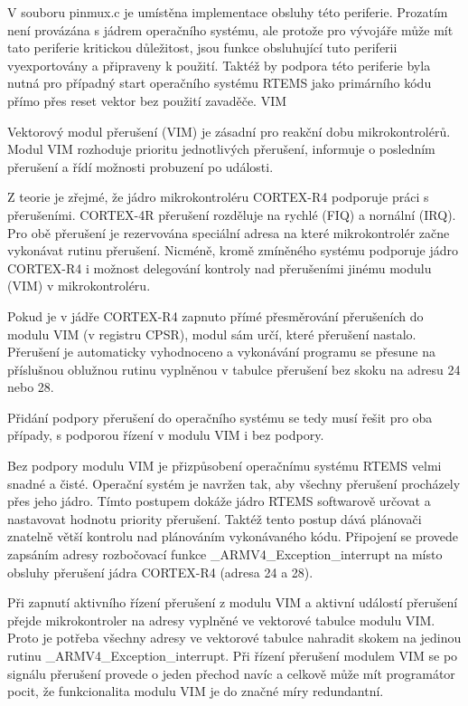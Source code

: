 V souboru pinmux.c je umístěna implementace obsluhy této periferie.
Prozatím není provázána s jádrem operačního systému, ale protože pro vývojáře může mít tato periferie kritickou důležitost, jsou funkce obsluhující tuto periferii vyexportovány a připraveny k použití.
Taktéž by podpora této periferie byla nutná pro případný start operačního systému RTEMS jako primárního kódu přímo přes reset vektor bez použití zavaděče.
\secc	VIM

Vektorový modul přerušení (VIM) je zásadní pro reakční dobu mikrokontrolérů.
Modul VIM rozhoduje prioritu jednotlivých přerušení, informuje o posledním přerušení a řídí možnosti probuzení po události.

Z teorie je zřejmé, že jádro mikrokontroléru CORTEX-R4 podporuje práci s přerušeními.
CORTEX-4R přerušení rozděluje na rychlé (FIQ) a nornální (IRQ).
Pro obě přerušení je rezervována speciální adresa na které mikrokontrolér začne vykonávat rutinu přerušení.
Nicméně, kromě zmíněného systému podporuje jádro CORTEX-R4 i možnost delegování kontroly nad přerušeními jinému modulu (VIM) v mikrokontroléru.

Pokud je v jádře CORTEX-R4 zapnuto přímé přesměrování přerušeních do modulu VIM (v registru CPSR), modul sám určí, které přerušení nastalo.
Přerušení je automaticky vyhodnoceno a vykonávání programu se přesune na příslušnou oblužnou rutinu vyplněnou v tabulce přerušení bez skoku na adresu 24 nebo 28.

Přidání podpory přerušení do operačního systému se tedy musí řešit pro oba případy, s podporou řízení v modulu VIM i bez podpory.

Bez podpory modulu VIM je přizpůsobení operačnímu systému RTEMS velmi snadné a čisté.
Operační systém je navržen tak, aby všechny přerušení procházely přes jeho jádro.
Tímto postupem dokáže jádro RTEMS softwarově určovat a nastavovat hodnotu priority přerušení.
Taktéž tento postup dává plánovači znatelně větší kontrolu nad plánováním vykonávaného kódu.
Připojení se provede zapsáním adresy rozbočovací funkce \_ARMV4\_Exception\_interrupt na místo obsluhy přerušení jádra CORTEX-R4 (adresa 24 a 28).

Při zapnutí aktivního řízení přerušení z modulu VIM a aktivní událostí přerušení přejde mikrokontroler na adresy vyplněné ve vektorové tabulce modulu VIM.
Proto je potřeba všechny adresy ve vektorové tabulce nahradit skokem na jedinou rutinu \_ARMV4\_Exception\_interrupt.
Při řízení přerušení modulem VIM se po signálu přerušení provede o jeden přechod navíc a celkově může mít programátor pocit, že funkcionalita modulu VIM je do značné míry redundantní.

